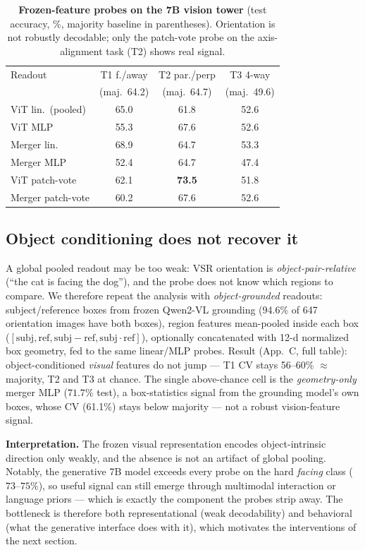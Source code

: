 \begin{table}[t]
\centering
\footnotesize
\setlength{\tabcolsep}{4pt}
\begin{threeparttable}
\caption{\textbf{Frozen-feature probes on the 7B vision tower} (test accuracy,
\%, majority baseline in parentheses). Orientation is not robustly decodable;
only the patch-vote probe on the axis-alignment task (T2) shows real signal.}
\label{tab:probe}
\begin{tabular}{lccc}
\toprule
Readout & T1 f./away & T2 par./perp & T3 4-way \\
 & (maj.\ 64.2) & (maj.\ 64.7) & (maj.\ 49.6) \\
\midrule
ViT lin.\ (pooled)   & 65.0 & 61.8 & 52.6 \\
ViT MLP              & 55.3 & 67.6 & 52.6 \\
Merger lin.          & 68.9 & 64.7 & 53.3 \\
Merger MLP           & 52.4 & 64.7 & 47.4 \\
ViT patch-vote       & 62.1 & \textbf{73.5} & 51.8 \\
Merger patch-vote    & 60.2 & 67.6 & 52.6 \\
\bottomrule
\end{tabular}
\end{threeparttable}
\end{table}

\subsection{Object conditioning does not recover it}
A global pooled readout may be too weak: VSR orientation is
\emph{object-pair-relative} (``the cat is facing the dog''), and the probe does
not know which regions to compare. We therefore repeat the analysis with
\emph{object-grounded} readouts: subject/reference boxes from frozen Qwen2-VL
grounding (94.6\% of 647 orientation images have both boxes), region features
mean-pooled inside each box ($[\text{subj}, \text{ref}, \text{subj}-\text{ref},
\text{subj}\cdot\text{ref}]$), optionally concatenated with 12-d normalized box
geometry, fed to the same linear/MLP probes. Result (App.~C,
full table): object-conditioned \emph{visual} features do not jump --- T1 CV
stays 56--60\% $\approx$ majority, T2 and T3 at chance. The single above-chance
cell is the \emph{geometry-only} merger MLP ($71.7\%$ test), a box-statistics
signal from the grounding model's own boxes, whose CV (61.1\%) stays below
majority --- not a robust vision-feature signal.

\textbf{Interpretation.} The frozen visual representation encodes
object-intrinsic direction only weakly, and the absence is not an artifact of
global pooling. Notably, the generative 7B model exceeds every probe on the hard
\emph{facing} class ($73$--$75\%$), so useful signal can still emerge through
multimodal interaction or language priors --- which is exactly the component the
probes strip away. The bottleneck is therefore both representational (weak
decodability) and behavioral (what the generative interface does with it), which
motivates the interventions of the next section.
